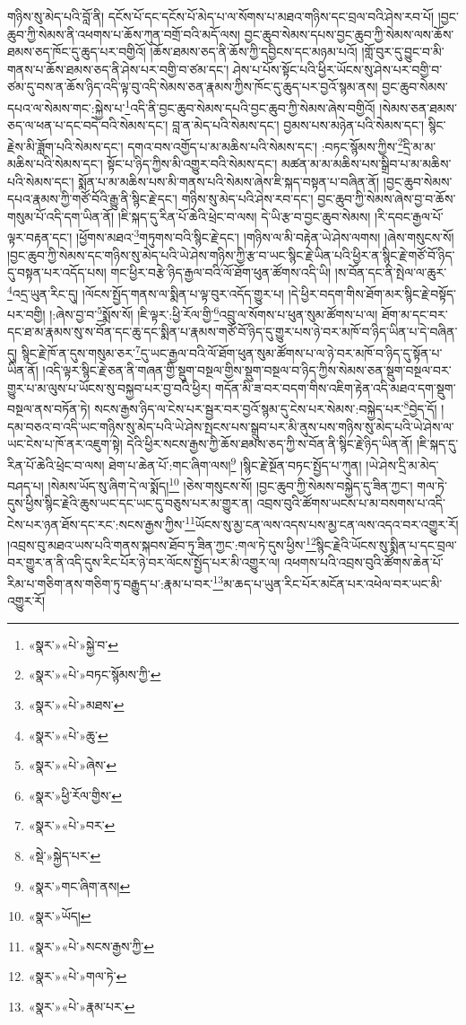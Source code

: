 གཉིས་སུ་མེད་པའི་བློ་ནི། དངོས་པོ་དང་དངོས་པོ་མེད་པ་ལ་སོགས་པ་མཐའ་གཉིས་དང་བྲལ་བའི་ཤེས་རབ་པོ། །བྱང་ཆུབ་ཀྱི་སེམས་ནི་འཕགས་པ་ཆོས་ཀུན་བགྲོ་བའི་མདོ་ལས། བྱང་ཆུབ་སེམས་དཔས་བྱང་ཆུབ་ཀྱི་སེམས་ལས་ཆོས་ཐམས་ཅད་ཁོང་དུ་ཆུད་པར་བགྱིའོ། །ཆོས་ཐམས་ཅད་ནི་ཆོས་ཀྱི་དབྱིངས་དང་མཉམ་པའོ། །གློ་བུར་དུ་བྱུང་བ་མི་གནས་པ་ཆོས་ཐམས་ཅད་ནི་ཤེས་པར་བགྱི་བ་ཙམ་དང་། ཤེས་པ་པོས་སྟོང་པའི་ཕྱིར་ཡོངས་སུ་ཤེས་པར་བགྱི་བ་ཙམ་དུ་བས་ན་ཆོས་ཉིད་འདི་ལྟ་བུ་འདི་སེམས་ཅན་རྣམས་ཀྱིས་ཁོང་དུ་ཆུད་པར་བྱའོ་སྙམ་ནས། བྱང་ཆུབ་སེམས་དཔའ་ལ་སེམས་གང་:སྐྱེས་པ་\footnote{«སྣར་»«པེ་»སྐྱེ་བ་}འདི་ནི་བྱང་ཆུབ་སེམས་དཔའི་བྱང་ཆུབ་ཀྱི་སེམས་ཞེས་བགྱིའོ། །སེམས་ཅན་ཐམས་ཅད་ལ་ཕན་པ་དང་བདེ་བའི་སེམས་དང་། བླ་ན་མེད་པའི་སེམས་དང་། བྱམས་པས་མཉེན་པའི་སེམས་དང་། སྙིང་རྗེས་མི་ཟློག་པའི་སེམས་དང་། དགའ་བས་འགྱོད་པ་མ་མཆིས་པའི་སེམས་དང་། :བཏང་སྙོམས་ཀྱིས་\footnote{«སྣར་»«པེ་»བཏང་སྙོམས་ཀྱི་}དྲི་མ་མ་མཆིས་པའི་སེམས་དང་། སྟོང་པ་ཉིད་ཀྱིས་མི་འགྱུར་བའི་སེམས་དང་། མཚན་མ་མ་མཆིས་པས་སྒྲིབ་པ་མ་མཆིས་པའི་སེམས་དང་། སྨོན་པ་མ་མཆིས་པས་མི་གནས་པའི་སེམས་ཞེས་ཇི་སྐད་བསྟན་པ་བཞིན་ནོ། །བྱང་ཆུབ་སེམས་དཔའ་རྣམས་ཀྱི་གཙོ་བོའི་རྒྱུ་ནི་སྙིང་རྗེ་དང་། གཉིས་སུ་མེད་པའི་ཤེས་རབ་དང་། བྱང་ཆུབ་ཀྱི་སེམས་ཞེས་བྱ་བ་ཆོས་གསུམ་པོ་འདི་དག་ཡིན་ནོ། །ཇི་སྐད་དུ་རིན་པོ་ཆེའི་ཕྲེང་བ་ལས། དེ་ཡི་རྩ་བ་བྱང་ཆུབ་སེམས། །རི་དབང་རྒྱལ་པོ་ལྟར་བརྟན་དང་། །ཕྱོགས་མཐའ་\footnote{«སྣར་»«པེ་»མཐས་}གཏུགས་བའི་སྙིང་རྗེ་དང་། །གཉིས་ལ་མི་བརྟེན་ཡེ་ཤེས་ལགས། །ཞེས་གསུངས་སོ། །བྱང་ཆུབ་ཀྱི་སེམས་དང་གཉིས་སུ་མེད་པའི་ཡེ་ཤེས་གཉིས་ཀྱི་རྩ་བ་ཡང་སྙིང་རྗེ་ཡིན་པའི་ཕྱིར་ན་སྙིང་རྗེ་གཙོ་བོ་ཉིད་དུ་བསྟན་པར་འདོད་པས། གང་ཕྱིར་བརྩེ་ཉིད་རྒྱལ་བའི་ལོ་ཐོག་ཕུན་ཚོགས་འདི་ཡི། །ས་བོན་དང་ནི་སྤེལ་ལ་ཆུར་\footnote{«སྣར་»«པེ་»ཆུ་}འདྲ་ཡུན་རིང་དུ། །ལོངས་སྤྱོད་གནས་ལ་སྨིན་པ་ལྟ་བུར་འདོད་གྱུར་པ། །དེ་ཕྱིར་བདག་གིས་ཐོག་མར་སྙིང་རྗེ་བསྟོད་པར་བགྱི། །:ཞེས་བྱ་བ་\footnote{«སྣར་»«པེ་»ཞེས་}སྨོས་སོ། །ཇི་ལྟར་:ཕྱི་རོལ་གྱི་\footnote{«སྣར་»ཕྱི་རོལ་གྱིས་}འབྲུ་ལ་སོགས་པ་ཕུན་སུམ་ཚོགས་པ་ལ། ཐོག་མ་དང་བར་དང་ཐ་མ་རྣམས་སུ་ས་བོན་དང་ཆུ་དང་སྨིན་པ་རྣམས་གཙོ་བོ་ཉིད་དུ་གྱུར་པས་ཉེ་བར་མཁོ་བ་ཉིད་ཡིན་པ་དེ་བཞིན་དུ། སྙིང་རྗེ་ཁོ་ན་དུས་གསུམ་ཅར་\footnote{«སྣར་»«པེ་»བར་}དུ་ཡང་རྒྱལ་བའི་ལོ་ཐོག་ཕུན་སུམ་ཚོགས་པ་ལ་ཉེ་བར་མཁོ་བ་ཉིད་དུ་སྟོན་པ་ཡིན་ནོ། །འདི་ལྟར་སྙིང་རྗེ་ཅན་ནི་གཞན་གྱི་སྡུག་བསྔལ་གྱིས་སྡུག་བསྔལ་བ་ཉིད་ཀྱིས་སེམས་ཅན་སྡུག་བསྔལ་བར་གྱུར་པ་མ་ལུས་པ་ཡོངས་སུ་བསྐྱབ་པར་བྱ་བའི་ཕྱིར། གདོན་མི་ཟ་བར་བདག་གིས་འཇིག་རྟེན་འདི་མཐའ་དག་སྡུག་བསྔལ་ནས་བཏོན་ཏེ། སངས་རྒྱས་ཉིད་ལ་ངེས་པར་སྦྱར་བར་བྱའོ་སྙམ་དུ་ངེས་པར་སེམས་:བསྐྱེད་པར་\footnote{«སྡེ་»སྐྱེད་པར་}བྱེད་དོ། །དམ་བཅའ་བ་འདི་ཡང་གཉིས་སུ་མེད་པའི་ཡེ་ཤེས་སྤངས་པས་སྒྲུབ་པར་མི་ནུས་པས་གཉིས་སུ་མེད་པའི་ཡེ་ཤེས་ལ་ཡང་ངེས་པ་ཁོ་ནར་འཇུག་སྟེ། དེའི་ཕྱིར་སངས་རྒྱས་ཀྱི་ཆོས་ཐམས་ཅད་ཀྱི་ས་བོན་ནི་སྙིང་རྗེ་ཉིད་ཡིན་ནོ། །ཇི་སྐད་དུ་རིན་པོ་ཆེའི་ཕྲེང་བ་ལས། ཐེག་པ་ཆེན་པོ་:གང་ཞིག་ལས།\footnote{«སྣར་»གང་ཞིག་ནས།} །སྙིང་རྗེ་སྔོན་བཏང་སྤྱོད་པ་ཀུན། །ཡེ་ཤེས་དྲི་མ་མེད་བཤད་པ། །སེམས་ཡོད་སུ་ཞིག་དེ་ལ་སྨོད།\footnote{«སྣར་»ཡོད།} །ཅེས་གསུངས་སོ། །བྱང་ཆུབ་ཀྱི་སེམས་བསྐྱེད་དུ་ཟིན་ཀྱང་། གལ་ཏེ་དུས་ཕྱིས་སྙིང་རྗེའི་ཆུས་ཡང་དང་ཡང་དུ་བཅུས་པར་མ་གྱུར་ན། འབྲས་བུའི་ཚོགས་ཡངས་པ་མ་བསགས་པ་འདི་ངེས་པར་ཉན་ཐོས་དང་རང་:སངས་རྒྱས་ཀྱིས་\footnote{«སྣར་»«པེ་»སངས་རྒྱས་ཀྱི་}ཡོངས་སུ་མྱ་ངན་ལས་འདས་པས་མྱ་ངན་ལས་འདའ་བར་འགྱུར་རོ། །འབྲས་བུ་མཐའ་ཡས་པའི་གནས་སྐབས་ཐོབ་ཏུ་ཟིན་ཀྱང་:གལ་ཏེ་དུས་ཕྱིས་\footnote{«སྣར་»«པེ་»གལ་ཏེ་}སྙིང་རྗེའི་ཡོངས་སུ་སྨིན་པ་དང་བྲལ་བར་གྱུར་ན་ནི་འདི་དུས་རིང་པོར་ཉེ་བར་ལོངས་སྤྱོད་པར་མི་འགྱུར་ལ། འཕགས་པའི་འབྲས་བུའི་ཚོགས་ཆེན་པོ་རིམ་པ་གཅིག་ནས་གཅིག་ཏུ་བརྒྱུད་པ་:རྣམ་པ་བར་\footnote{«སྣར་»«པེ་»རྣམ་པར་}མ་ཆད་པ་ཡུན་རིང་པོར་མངོན་པར་འཕེལ་བར་ཡང་མི་འགྱུར་རོ། 